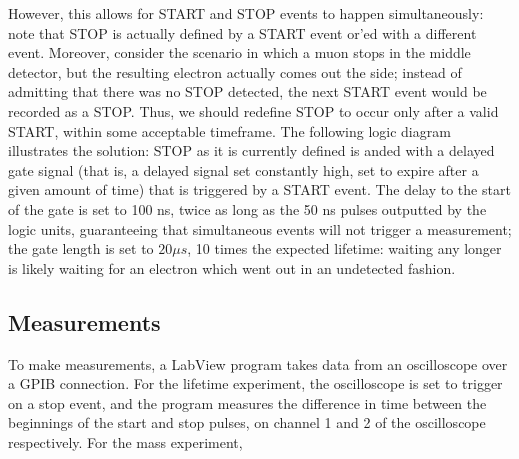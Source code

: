 However, this allows for START and STOP events to happen simultaneously: note that STOP is actually defined by a START event or'ed with a different event. Moreover, consider the scenario in which a muon stops in the middle detector, but the resulting electron actually comes out the side; instead of admitting that there was no STOP detected, the next START event would be recorded as a STOP. Thus, we should redefine STOP to occur only after a valid START, within some acceptable timeframe. The following logic diagram illustrates the solution: STOP as it is currently defined is anded with a delayed gate signal (that is, a delayed signal set constantly high, set to expire after a given amount of time) that is triggered by a START event. The delay to the start of the gate is set to 100 ns, twice as long as the 50 ns pulses outputted by the logic units, guaranteeing that simultaneous events will not trigger a measurement; the gate length is set to $20 \mu s$, 10 times the expected lifetime: waiting any longer is likely waiting for an electron which went out in an undetected fashion.

\subsection{Measurements}
To make measurements, a LabView program takes data from an oscilloscope over a GPIB connection. For the lifetime experiment, the oscilloscope is set to trigger on a stop event, and the program measures the difference in time between the beginnings of the start and stop pulses, on channel 1 and 2 of the oscilloscope respectively. For the mass experiment, 
